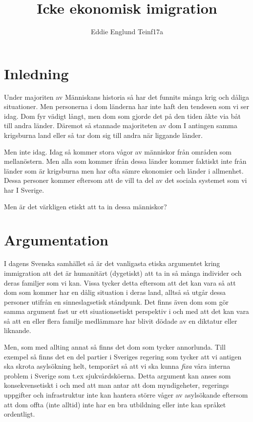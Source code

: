 \documentclass[12pt, onecolumn, letterpaper]{article}
\author{Eddie Englund Teinf17a}
\title{Icke ekonomisk imigration}
\begin{document}
    
    \maketitle

    \section{Inledning}

    Under majoriten av Människans historia så har det funnits många krig och dåliga situationer. Men personerna i dom länderna har inte haft den tendesen som vi ser idag. Dom fyr vädigt långt, men dom som gjorde det på den tiden åkte via båt till andra länder. Däremot så stannade majoriteten av dom I antingen samma krigsburna land eller så tar dom sig till andra när liggande länder.

    Men inte idag. Idag så kommer stora vågor av människor från områden som mellanöstern\cite{Guardian}. Men alla som kommer ifrån dessa länder kommer faktiskt inte från länder som är krigsburna men har ofta sämre ekonomier och länder i allmenhet. Dessa personer kommer eftersom att de vill ta del av det sociala systemet som vi har I Sverige.

    Men är det värkligen etiskt att ta in dessa människor?

    \section{Argumentation}


    I dagens Svenska samhället så är det vanligasta etiska argumentet kring immigration att det är humanitärt (dygetiskt) att ta in så många individer och deras familjer som vi kan. Vissa tycker detta eftersom att det kan vara så att dom som kommer har en dålig situation i deras land, alltså så utgår dessa personer utifrån en sinneslagsetisk ståndpunk. Det finns även dom som gör samma argument fast ur ett siuationsetiskt perspektiv i och med att det kan vara så att en eller flera familje medlämmare har blivit dödade av en diktatur eller liknande.

    Men, som med allting annat så finns det dom som tycker annorlunda. Till exempel så finns det en del partier i Sveriges regering som tycker att vi antigen ska skrota asylsökning helt, temporärt så att vi ska kunna \textit{fixa} våra interna problem i Sverige som t.ex sjukvårdsköerna. Detta argument kan anses som konsekvensetiskt i och med att man antar att dom myndigeheter, regerings uppgifter och infrastruktur inte kan hantera större våger av asylsökande eftersom att dom offta (inte alltid) inte har en bra utbildning eller inte kan språket ordentligt.
\end{document}

